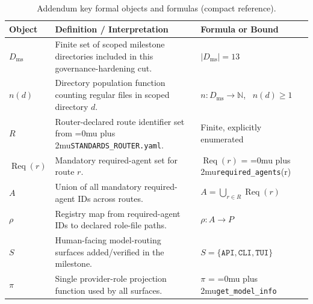 \documentclass[12pt]{article}
\theoremstyle{definition}
\DeclareRobustCommand{\code}[1]{\begingroup\Urlmuskip=0mu plus 2mu\relax\nolinkurl{#1}\endgroup}
\begin{document}
\begin{table}[H]
\centering
\caption{Addendum key formal objects and formulas (compact reference).}
\label{tab:addendum-key-formulas}
\begin{tabularx}{\linewidth}{@{}>{\RaggedRight\arraybackslash}p{3.0cm}>{\RaggedRight\arraybackslash}X>{\RaggedRight\arraybackslash}p{4.0cm}@{}}
\toprule
\textbf{Object} & \textbf{Definition / Interpretation} & \textbf{Formula or Bound} \\
\midrule
$D_{\mathrm{ms}}$ & Finite set of scoped milestone directories included in this governance-hardening cut. & $|D_{\mathrm{ms}}| = 13$ \\
$n(d)$ & Directory population function counting regular files in scoped directory $d$. & $n : D_{\mathrm{ms}} \to \mathbb{N}$, \ $n(d) \ge 1$ \\
$R$ & Router-declared route identifier set from \code{STANDARDS\_ROUTER.yaml}. & Finite, explicitly enumerated \\
$\operatorname{Req}(r)$ & Mandatory required-agent set for route $r$. & $\operatorname{Req}(r)$ = \code{required\_agents}(r) \\
$A$ & Union of all mandatory required-agent IDs across routes. & $A = \bigcup_{r \in R}\operatorname{Req}(r)$ \\
$\rho$ & Registry map from required-agent IDs to declared role-file paths. & $\rho : A \to P$ \\
$S$ & Human-facing model-routing surfaces added/verified in the milestone. & $S=\{\texttt{API},\texttt{CLI},\texttt{TUI}\}$ \\
$\pi$ & Single provider-role projection function used by all surfaces. & $\pi$ = \code{get\_model\_info} \\
\bottomrule
\end{tabularx}
\end{table}
\end{document}
